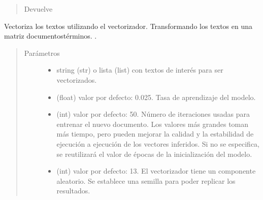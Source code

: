 \documentclass[letterpaper,10pt,openany,spanish]{sphinxmanual}
\begin{document}
\begin{fulllineitems}
\begin{fulllineitems}
\begin{quote}
\begin{description}
\begin{itemize}
\end{itemize}

\item[{Devuelve}] \leavevmode


\end{description}\end{quote}

\end{fulllineitems}


\begin{fulllineitems}
\label{\detokenize{funciones/vectorizacion:vectorizacion.VectorizadorDoc2Vec.vectorizar}}
Vectoriza los textos utilizando el vectorizador. 
Transformando los textos en una matriz documentos\sphinxhyphen{}términos. 
.
\begin{quote}\begin{description}
\item[{Parámetros}] \leavevmode\begin{itemize}
\item {} 
 \textendash{} string (str) o lista (list) con textos de interés 
para ser vectorizados.

\item {} 
 \textendash{} (float) valor por defecto: 0.025. 
Tasa de aprendizaje del modelo.

\item {} 
 \textendash{} (int) valor por defecto: 50. Número de iteraciones 
usadas para entrenar el nuevo documento. Los valores más grandes 
toman más tiempo, pero pueden mejorar la calidad y la estabilidad 
de ejecución a ejecución de los vectores inferidos. Si no se 
especifica, se reutilizará el valor de épocas de la 
inicialización del modelo.

\item {} 
 \textendash{} (int) valor por defecto: 13. El vectorizador tiene un 
componente aleatorio. Se establece una semilla para poder 
replicar los resultados.


\end{itemize}
\end{description}
\end{quote}
\end{fulllineitems}
\end{fulllineitems}
\end{document}
